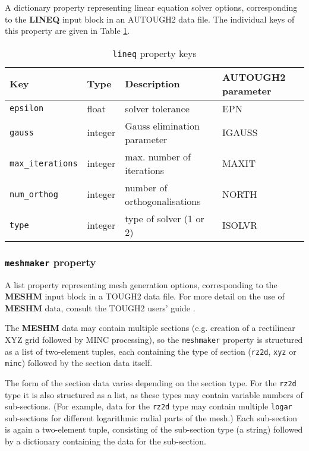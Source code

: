A dictionary property representing linear equation solver options, corresponding to the \textbf{LINEQ} input block in an AUTOUGH2 data file.  The individual keys of this property are given in Table \ref{tb:lineq}.

\begin{table}
  \begin{center}
    \begin{tabular}{|l|l|l|l|}
      \hline
      \textbf{Key} & \textbf{Type} & \textbf{Description} & \textbf{AUTOUGH2 parameter}\\
      \hline
      \texttt{epsilon} & float & solver tolerance & EPN\\
      \texttt{gauss} & integer & Gauss elimination parameter & IGAUSS\\
      \texttt{max\_iterations} & integer & max. number of iterations & MAXIT\\
      \texttt{num\_orthog} & integer & number of orthogonalisations & NORTH\\
      \texttt{type} & integer & type of solver (1 or 2) & ISOLVR\\
      \hline
    \end{tabular}
    \caption{\texttt{lineq} property keys}
    \label{tb:lineq}
  \end{center}
\end{table}

\subsubsection{\texttt{meshmaker} property}

A list property representing mesh generation options, corresponding to the \textbf{MESHM} input block in a TOUGH2 data file.  For more detail on the use of \textbf{MESHM} data, consult the TOUGH2 users' guide \citep{tough2}.

The \textbf{MESHM} data may contain multiple sections (e.g. creation of a rectilinear XYZ grid followed by MINC processing), so the \texttt{meshmaker} property is structured as a list of two-element tuples, each containing the type of section (\texttt{rz2d}, \texttt{xyz} or \texttt{minc}) followed by the section data itself.

The form of the section data varies depending on the section type.  For the \texttt{rz2d} type it is also structured as a list, as these types may contain variable numbers of sub-sections.  (For example, data for the \texttt{rz2d} type may contain multiple \texttt{logar} sub-sections for different logarithmic radial parts of the mesh.)  Each sub-section is again a two-element tuple, consisting of the sub-section type (a string) followed by a dictionary containing the data for the sub-section.


